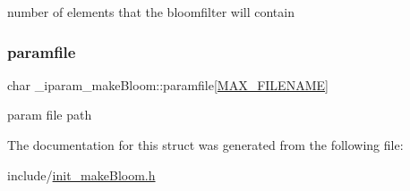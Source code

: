 number of elements that the bloomfilter will contain \mbox{\label{struct__iparam__makeBloom_a8cf429229a99acfab0ce48046f42dfac}} 
\subsubsection{\texorpdfstring{paramfile}{paramfile}}
{\footnotesize\ttfamily char \+\_\+iparam\+\_\+make\+Bloom\+::paramfile\mbox{[}\mbox{\hyperlink{defines_8h_abe0ec333b60117063f9b9fd9f849cb08}{M\+A\+X\+\_\+\+F\+I\+L\+E\+N\+A\+ME}}\mbox{]}}

param file path 

The documentation for this struct was generated from the following file\+:\begin{DoxyCompactItemize}
\item 
include/\mbox{\hyperlink{init__makeBloom_8h}{init\+\_\+make\+Bloom.\+h}}\end{DoxyCompactItemize}
